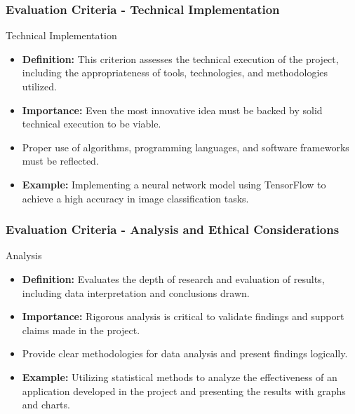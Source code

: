 \documentclass{beamer}
\begin{document}
\begin{frame}[fragile]
    \frametitle{Evaluation Criteria - Technical Implementation}
    \begin{block}{Technical Implementation}
        \begin{itemize}
            \item \textbf{Definition:} This criterion assesses the technical execution of the project, including the appropriateness of tools, technologies, and methodologies utilized.
            \item \textbf{Importance:} Even the most innovative idea must be backed by solid technical execution to be viable.
        \end{itemize}
    \end{block}
    \begin{itemize}
        \item Proper use of algorithms, programming languages, and software frameworks must be reflected.
        \item \textbf{Example:} Implementing a neural network model using TensorFlow to achieve a high accuracy in image classification tasks.
    \end{itemize}
\end{frame}

\begin{frame}[fragile]
    \frametitle{Evaluation Criteria - Analysis and Ethical Considerations}
    \begin{block}{Analysis}
        \begin{itemize}
            \item \textbf{Definition:} Evaluates the depth of research and evaluation of results, including data interpretation and conclusions drawn.
            \item \textbf{Importance:} Rigorous analysis is critical to validate findings and support claims made in the project.
        \end{itemize}
    \end{block}
    \begin{itemize}
        \item Provide clear methodologies for data analysis and present findings logically.
        \item \textbf{Example:} Utilizing statistical methods to analyze the effectiveness of an application developed in the project and presenting the results with graphs and charts.
    \end{itemize}
\end{frame}
\end{document}
